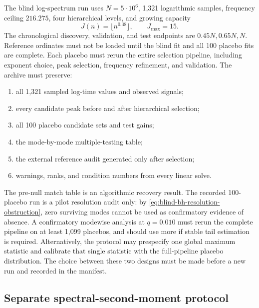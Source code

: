 \documentclass[11pt,reqno]{amsart}
\numberwithin{equation}{section}
\theoremstyle{plain}
\theoremstyle{definition}
\theoremstyle{remark}
\begin{document}
The blind log-spectrum run uses \(N=5\cdot10^6\), 1,321 logarithmic samples,
frequency ceiling \(216.275\), four hierarchical levels, and growing capacity
\begin{equation}
J(n)=\lfloor n^{0.38}\rfloor,\qquad J_{\max}=15.
\label{eq:blind-spectrum-capacity}
\end{equation}
The chronological discovery, validation, and test endpoints are
\(0.45N,0.65N,N\).  Reference ordinates must not be loaded until the blind
fit and all 100 placebo fits are complete.  Each placebo must rerun the
entire selection pipeline, including exponent choice, peak selection,
frequency refinement, and validation.  The archive must preserve:
\begin{enumerate}[label=(\alph*)]
\item all 1,321 sampled log-time values and observed signals;
\item every candidate peak before and after hierarchical selection;
\item all 100 placebo candidate sets and test gains;
\item the mode-by-mode multiple-testing table;
\item the external reference audit generated only after selection;
\item warnings, ranks, and condition numbers from every linear solve.
\end{enumerate}
The pre-null match table is an algorithmic recovery result.  The recorded
100-placebo run is a pilot resolution audit only: by
\eqref{eq:blind-bh-resolution-obstruction}, zero surviving modes cannot be
used as confirmatory evidence of absence.  A confirmatory modewise analysis
at \(q=0.010\) must rerun the complete pipeline on at least 1,099 placebos,
and should use more if stable tail estimation is required.  Alternatively,
the protocol may prespecify one global maximum statistic and calibrate that
single statistic with the full-pipeline placebo distribution.  The choice
between these two designs must be made before a new run and recorded in the
manifest.

\subsection{Separate spectral-second-moment protocol}
\label{subsec:spectral-second-moment-protocol}
\end{document}
